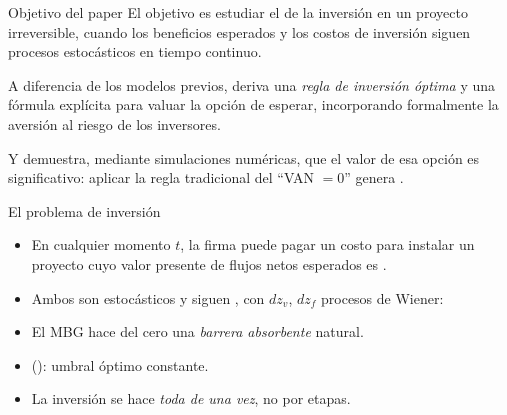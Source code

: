 \begin{frame}{Objetivo del paper}
  \vspace{5mm}
  El objetivo es estudiar el  de la inversión en un
  proyecto irreversible, cuando los beneficios esperados y los costos de
  inversión siguen procesos estocásticos en tiempo continuo.
  \par\vspace{6mm}
  A diferencia de los modelos previos, deriva una \emph{regla de
  inversión óptima} y una fórmula explícita para valuar la opción de esperar,
  incorporando formalmente la aversión al riesgo de los
  inversores.
  \par\vspace{6mm}
  Y demuestra, mediante simulaciones numéricas, que el valor de esa opción es
  significativo: aplicar la regla tradicional del ``VAN $=0$'' genera
  .
\end{frame}

\begin{frame}{El problema de inversión}
  \begin{itemize}
    \item En cualquier momento $t$, la firma puede pagar un costo 
          para instalar un proyecto cuyo valor presente de flujos netos
          esperados es .
    \item Ambos son estocásticos y siguen , con $dz_v$, $dz_f$ procesos de Wiener:
  \end{itemize}
  \begin{ec}
    \qquad\qquad
  \end{ec}
  \vspace{-3mm}
  \begin{itemize}
    \item El MBG hace del cero una \emph{barrera absorbente} natural.
    \item {} (): umbral óptimo constante.
    \item La inversión se hace \emph{toda de una vez}, no por etapas.
  \end{itemize}
\end{frame}

